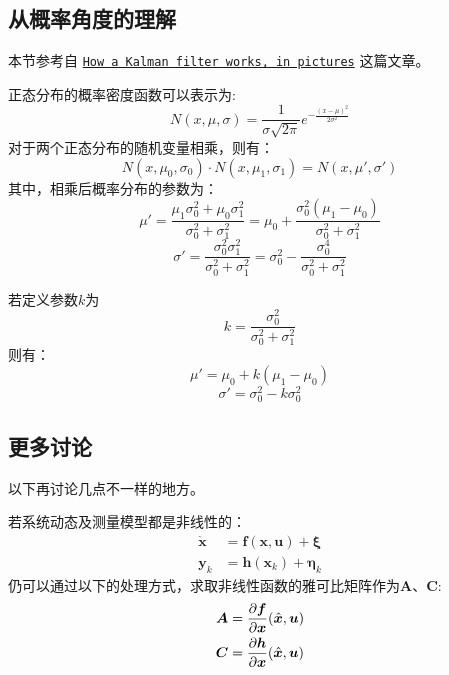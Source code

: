 \subsection{从概率角度的理解}
本节参考自
\href{http://www.bzarg.com/p/how-a-kalman-filter-works-in-pictures/}{\texttt{How a Kalman filter works, in pictures}}
这篇文章。

正态分布的概率密度函数可以表示为:
\begin{equation*}
    N(x,\mu, \sigma) = \frac{1}{\sigma \sqrt{2 \pi}} e^{-\frac{(x-\mu)^2}{2\sigma^2}}
\end{equation*}
对于两个正态分布的随机变量相乘，则有： 
\begin{equation*}
    N(x,\mu_0, \sigma_0) \cdot N(x,\mu_1, \sigma_1) = N(x,\mu', \sigma')
\end{equation*}
其中，相乘后概率分布的参数为：
\begin{equation*}
    \mu' = \frac{\mu_1 \sigma_0^2 + \mu_0 \sigma_1^2}{\sigma_0^2 + \sigma_1^2} = \mu_0 + \frac{\sigma_0^2(\mu_1 - \mu_0)}{\sigma_0^2 + \sigma_1^2}
\end{equation*}
\begin{equation*}
    \sigma' = \frac{\sigma_0^2 \sigma_1^2}{\sigma_0^2 + \sigma_1^2} = \sigma_0^2 - \frac{\sigma_0^4}{\sigma_0^2 + \sigma_1^2}
\end{equation*}

若定义参数$k$为
\begin{equation*}
    k = \frac{\sigma_0^2}{\sigma_0^2 + \sigma_1^2}
\end{equation*}
则有：
\begin{equation*}
    \mu' = \mu_0 + k(\mu_1 - \mu_0)
\end{equation*}
\begin{equation*}
    \sigma' = \sigma_0^2 - k\sigma_0^2
\end{equation*}





\subsection{更多讨论}
以下再讨论几点不一样的地方。


若系统动态及测量模型都是非线性的：
\begin{align*}
    \dot{\bm{x}} &= \bm{f}(\bm{x}, \bm{u}) + \bm{\xi} \\
    \bm{y}_k &= \bm{h}(\bm{x}_k) + \bm{\eta}_k
\end{align*}
仍可以通过以下的处理方式，求取非线性函数的雅可比矩阵作为$\bm{A}$、$\bm{C}$:
\begin{align*}
    \bm{A} &= \frac{\partial\bm{f}}{\partial \bm{x}}(\hat{\bm{x}}, \bm{u}) \\
    \bm{C} &= \frac{\partial\bm{h}}{\partial \bm{x}}(\hat{\bm{x}}, \bm{u})
\end{align*}

